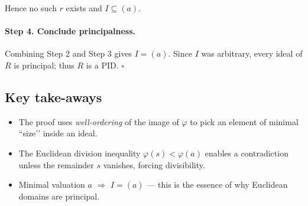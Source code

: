 \documentclass[12pt]{article}
\theoremstyle{definition} %
\theoremstyle{plain} %
\begin{document}
\smallskip
Hence no such \(r\) exists and \(I\subseteq(a)\).

\medskip
\paragraph{Step 4.  Conclude principalness.}
Combining Step 2 and Step 3 gives \(I=(a)\).  
Since \(I\) was arbitrary, every ideal of \(R\) is principal;  
thus \(R\) is a PID. \(\square\)

\bigskip
\subsection*{Key take-aways}

\begin{itemize}
  \item The proof uses \emph{well-ordering} of the image of \(\varphi\)
        to pick an element of minimal “size’’ inside an ideal.
  \item The Euclidean division inequality
        \(\varphi(s)<\varphi(a)\) enables a contradiction unless
        the remainder \(s\) vanishes, forcing divisibility.
  \item Minimal valuation \(a\) \(\Longrightarrow\) \(I=(a)\) —
        this is the essence of why Euclidean domains are principal.
\end{itemize}
\end{document}

